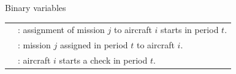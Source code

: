 \begin{frame}[t]
\frametitle{\textbf{\firsttitleF}}
  
  \begin{block}{Binary variables}
    \begin{tabular}{ll}
      \onslide<+->{
        $a^s_{ijt}$ &  : assignment of mission $j$ to aircraft $i$ starts in period $t$.
      }  \\
      \onslide<+->{
        $a_{ijt}$ &  :  mission $j$ assigned in period $t$ to aircraft $i$.
      }  \\
      \onslide<4->{
        $m_{it}$   & :  aircraft $i$ starts a check in period $t$.
      }
    \end{tabular}
  \end{block}

  
\end{frame}


%         


